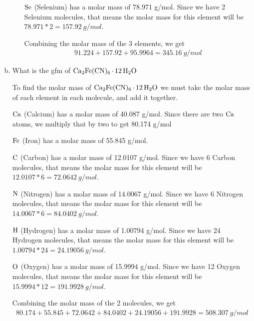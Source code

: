 \documentclass[11pt]{article}
\begin{document}
\begin{enumerate}[(a)]
\begin{enumerate}
\(\ce{Se}\) (Selenium) has a molar mass of 78.971 g/mol. Since we have 2
Selenium molecules, that means the molar mass for this element will be
\(78.971*2=157.92\ g/mol\).

Combining the molar mass of the 3 elements, we get
\begin{align*}
91.224+157.92+95.9964=345.16\ g/mol
\end{align*}
\end{enumerate}

\item What is the gfm of \(\ce{Ca2Fe(CN)6*12H2O}\)

 To find the molar mass of \(\ce{Ca2Fe(CN)6*12H2O}\) we must take the molar
mass of each element in each molecule, and add it together.

\(\ce{Ca}\) (Calcium) has a molar mass of 40.087 g/mol. Since there are two
  \(\ce{Ca}\) atoms, we multiply that by two to get 80.174 g/mol

\(\ce{Fe}\) (Iron) has a molar mass of 55.845 g/mol.

\(\ce{C}\) (Carbon) has a molar mass of 12.0107 g/mol. Since we have 6
Carbon molecules, that means the molar mass for this element will be
\(12.0107*6=72.0642\ g/mol\).

\(\ce{N}\) (Nitrogen) has a molar mass of 14.0067 g/mol. Since we have 6
Nitrogen molecules, that means the molar mass for this element will be
\(14.0067*6=84.0402\ g/mol\).

\(\ce{H}\) (Hydrogen) has a molar mass of 1.00794 g/mol. Since we have 24
Hydrogen molecules, that means the molar mass for this element will be
\(1.00794*24=24.19056\ g/mol\).

\(\ce{O}\) (Oxygen) has a molar mass of 15.9994 g/mol. Since we have 12
Oxygen molecules, that means the molar mass for this element will be
\(15.9994*12=191.9928\ g/mol\).

Combining the molar mass of the 2 molecules, we get
\begin{align*}
80.174+55.845+72.0642+84.0402+24.19056+191.9928=508.307\ g/mol
\end{align*}
\end{enumerate}
\end{document}
